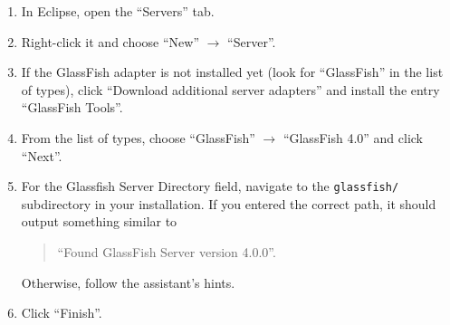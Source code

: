 \begin{enumerate}
\item In Eclipse, open the \enquote{Servers} tab.
\item Right-click it and choose \enquote{New} $\rightarrow$ \enquote{Server}.
\item If the GlassFish adapter is not installed yet (look for \enquote{GlassFish} in the list of types), click \enquote{Download additional server adapters} and install the entry \enquote{GlassFish Tools}.
\item From the list of types, choose \enquote{GlassFish} $\rightarrow$ \enquote{GlassFish 4.0} and click \enquote{Next}.
\item For the Glassfish Server Directory field, navigate to the \lstinline[language=Simple]|glassfish/| subdirectory in your installation. If you entered the correct path, it should output something similar to
	\begin{quotation}
	\enquote{Found GlassFish Server version 4.0.0}.
	\end{quotation}
	Otherwise, follow the assistant's hints.
\item Click \enquote{Finish}.

\end{enumerate}
